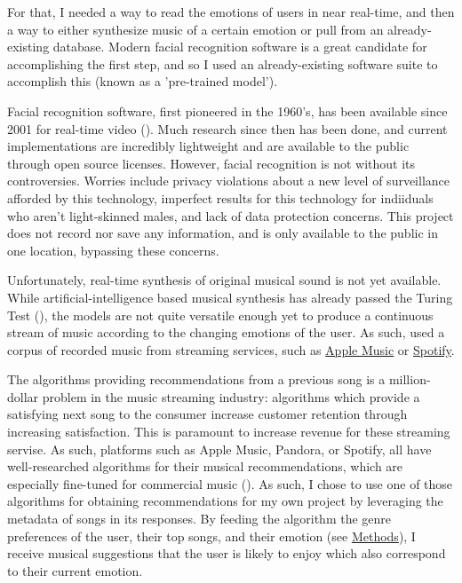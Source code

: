 \documentclass{article}
\renewcommand{\_}[1]{\underline{ #1 }}
\theoremstyle{definition}
\begin{document}
For that, I needed a way to read the emotions of users in near real-time, and then a way to either synthesize music of a certain emotion or pull from an already-existing database. Modern facial recognition software is a great candidate for accomplishing the first step, and so I used an already-existing software suite to accomplish this (known as a 'pre-trained model').

Facial recognition software, first pioneered in the 1960's, has been available since 2001 for real-time video (\cite{yamaguchi2012}). Much research since then has been done, and current implementations are incredibly lightweight and are available to the public through open source licenses. However, facial recognition is not without its controversies. Worries include privacy violations about a new level of surveillance afforded by this technology, imperfect results for this technology for indiiduals who aren't light-skinned males, and lack of data protection concerns. This project does not record nor save any information, and is only available to the public in one location, bypassing these concerns. 

Unfortunately, real-time synthesis of original musical sound is not yet available. While artificial-intelligence based musical synthesis has already passed the Turing Test (\cite{ailabs2018}), the models are not quite versatile enough yet to produce a continuous stream of music according to the changing emotions of the user. As such, used a corpus of recorded music from streaming services, such as \href{https://www.apple.com/apple-music/}{Apple Music} or \href{https://www.spotify.com/us/}{Spotify}.

The algorithms providing recommendations from a previous song is a million-dollar problem in the music streaming industry: algorithms which provide a satisfying next song to the consumer increase customer retention through increasing satisfaction. This is paramount to increase revenue for these streaming servise. As such, platforms such as Apple Music, Pandora, or Spotify, all have well-researched algorithms for their musical recommendations, which are especially fine-tuned for commercial music (\cite{drott2018}). As such, I chose to use one of those algorithms for obtaining recommendations for my own project by leveraging the metadata of songs in its responses. By feeding the algorithm the genre preferences of the user, their top songs, and their emotion (see \hyperref[Methods]{Methods}), I receive musical suggestions that the user is likely to enjoy which also correspond to their current emotion.
\end{document}
